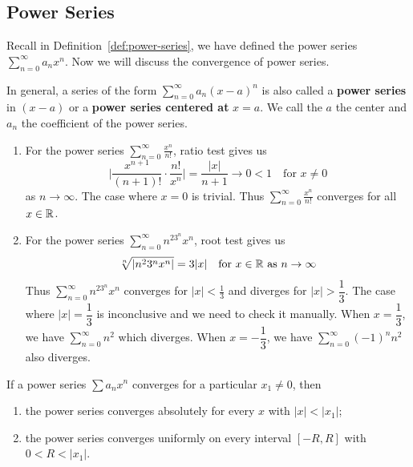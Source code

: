 \documentclass[a4paper]{ctexart}
\begin{document}
    \subsection{Power Series}
    Recall in Definition~\ref{def:power-series}, we have defined the power series $\displaystyle \sum_{n=0}^\infty a_n x^n$. Now we will discuss the convergence of power series.
    \begin{mydef}
        In general, a series of the form $\displaystyle \sum_{n=0}^\infty a_n (x-a)^n$ is also called a \textbf{power series} in $(x-a)$ or a \textbf{power series centered at} $x=a$. We call the $a$ the center and $a_n$ the coefficient of the power series.
    \end{mydef}
    \begin{myex}
        \begin{enumerate}
            \item For the power series $\displaystyle \sum_{n=0}^\infty \frac{x^n}{n!}$, ratio test gives us
            $$ \big| \frac{x^{n+1}}{(n+1)!} \cdot \frac{n!}{x^n} \big| = \frac{|x|}{n+1} \to 0 < 1\quad \text{for } x\neq 0$$
            as $n\to \infty$. The case where $x=0$ is trivial. Thus $\displaystyle \sum_{n=0}^\infty \frac{x^n}{n!}$ converges for all $x\in \mathbb{R}$.
            \item For the power series $\displaystyle \sum_{n=0}^\infty n^23^n x^n$, root test gives us
            $$ \sqrt[n]{|n^23^n x^n|} = 3|x| \quad \text{for } x\in \mathbb{R} \text{ as } n\to \infty$$
            Thus $\displaystyle \sum_{n=0}^\infty n^23^n x^n$ converges for $|x| < \frac{1}{3}$ and diverges for $|x| > \dfrac{1}{3}$. The case where $|x| = \dfrac{1}{3}$ is inconclusive and we need to check it manually. When $x=\dfrac{1}{3}$, we have $\displaystyle \sum_{n=0}^\infty n^2$ which diverges. When $x=-\dfrac{1}{3}$, we have $\displaystyle \sum_{n=0}^\infty (-1)^n n^2$ also diverges.
        \end{enumerate}
    \end{myex}
    \begin{mythm}\label{convergence_power_series}
        If a power series $\sum a_n x^n$ converges for a particular $x_1 \neq 0$, then
        \begin{enumerate}[label=(\alph*)]
            \item the power series converges absolutely for every $x$ with $|x| < |x_1|$;
            \item the power series converges uniformly on every interval $[-R,R]$ with $0<R<|x_1|$.
        \end{enumerate}
    \end{mythm}
\end{document}
